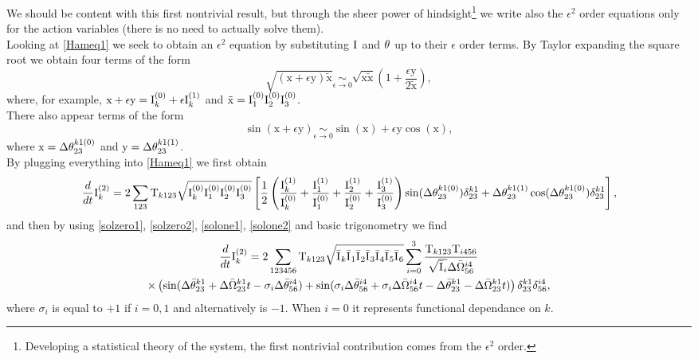 We should be content with this first nontrivial result, but through the sheer power of hindsight\footnote{Developing a 
statistical theory of the system, the first nontrivial contribution comes from the $\epsilon^2$ order.}
we write also the 
$\epsilon^2$ order equations only for the action variables (there is no need to actually solve them). \\
Looking at \eqref{Hameq1} we seek to obtain an $\epsilon^2$ equation by substituting $\mathrm{I}^{}$ and $\theta^{}$ up to their $\epsilon$ order terms. By Taylor expanding the square root 
we obtain four terms of the form
\begin{equation}
    \sqrt{(\mathrm{x} +\epsilon \mathrm{y})\mathrm{\tilde{x}}} \underset{\epsilon \rightarrow 0}{\sim} 
    \sqrt{\mathrm{x}\mathrm{\tilde{x}}}\left( 1 + \frac{\epsilon \mathrm{y}}{2\mathrm{\tilde{x}}}\right),
\end{equation}
where, for example, $\mathrm{x} + \epsilon \mathrm{y} = \mathrm{I}^{(0)}_k + \epsilon \mathrm{I}^{(1)}_k$ and $\mathrm{\tilde{x}} = \mathrm{I}^{(0)}_1\mathrm{I}^{(0)}_2\mathrm{I}^{(0)}_3$.\\
There also appear terms of the form
\begin{equation}
    \sin(\mathrm{x} + \epsilon \mathrm{y}) \underset{\epsilon \rightarrow 0}{\sim} \sin(\mathrm{x}) + \epsilon \mathrm{y} \cos(\mathrm{x}),
\end{equation} 
where $\mathrm{x} = \Delta\theta^{k1(0)}_{23}$ and $\mathrm{y} = \Delta\theta^{k1(1)}_{23}$.\\
By plugging everything into \eqref{Hameq1} we first obtain
\begin{equation}
    \frac{d}{dt} \mathrm{I}^{(2)}_k = 2 \sum_{123} \mathrm{T}_{k123} \sqrt{\mathrm{I}^{(0)}_k\mathrm{I}^{(0)}_1\mathrm{I}^{(0)}_2\mathrm{I}^{(0)}_3} \left[ \frac{1}{2}\left(\frac{\mathrm{I}^{(1)}_k}{\mathrm{I}^{(0)}_k}+\frac{\mathrm{I}^{(1)}_1}{\mathrm{I}^{(0)}_1}+
    \frac{\mathrm{I}^{(1)}_2}{\mathrm{I}^{(0)}_2}+\frac{\mathrm{I}^{(1)}_3}{\mathrm{I}^{(0)}_3} \right)\sin(\Delta\theta^{k1(0)}_{23})\delta^{k1}_{23} + 
    \Delta\theta^{k1(1)}_{23}\cos(\Delta\theta^{k1(0)}_{23}) \delta^{k1}_{23}\right],
\end{equation}
and then by using \eqref{solzero1}, \eqref{solzero2}, \eqref{solone1}, \eqref{solone2} and basic trigonometry we find
\begin{multline}
    \frac{d}{dt} \mathrm{I}^{(2)}_k = 2 \sum_{123456}\mathrm{T}_{k123} \sqrt{\bar{\mathrm{I}^{}}_k\bar{\mathrm{I}^{}}_1\bar{\mathrm{I}^{}}_2\bar{\mathrm{I}^{}}_3\bar{\mathrm{I}^{}}_4\bar{\mathrm{I}^{}}_5\bar{\mathrm{I}^{}}_6} 
    \sum_{i=0}^{3}\frac{\mathrm{T}_{k123}\mathrm{T}_{i456}}{\sqrt{\bar{\mathrm{I}^{}}_i}\Delta\bar{\Omega}^{i4}_{56}} \\
    \times\left(\sin(\Delta\bar{\theta}^{k1}_{23} + \Delta\bar{\Omega}^{k1}_{23}t - \sigma_i \Delta\bar{\theta}^{i4}_{56}) 
    + \sin(\sigma_i \Delta\bar{\theta}^{i4}_{56} + \sigma_i\Delta\bar{\Omega}^{i4}_{56}t -\Delta\bar{\theta}^{k1}_{23} - \Delta\bar{\Omega}^{k1}_{23}t)  \right)\delta^{k1}_{23}\delta^{i4}_{56}, 
    \label{eqeps2}
\end{multline}
where $\sigma_i$ is equal to $+1$ if $i=0,1$ and alternatively is $-1$. When $i=0$ it represents functional dependance on $k$.\\
